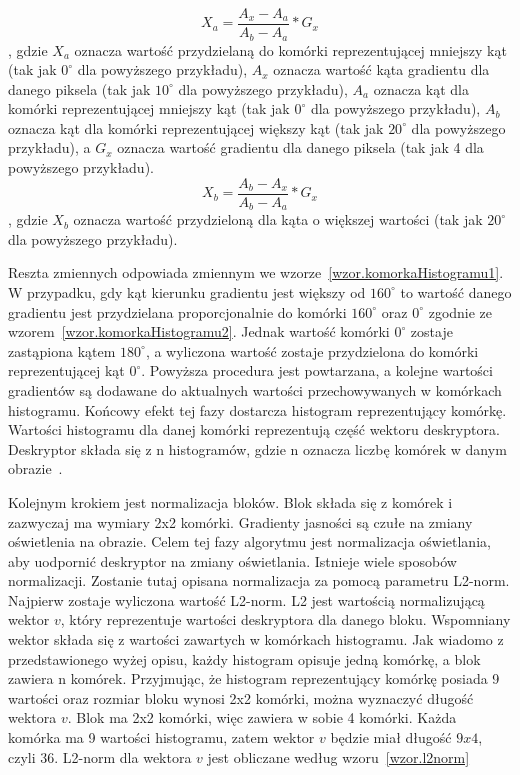 \documentclass[a4paper,twoside,12pt]{book}
\begin{document}
    \large
    \begin{equation}
        X_{a} = \frac{A_{x}-A_{a}}{A_{b}-A_{a}}*G_{x}
        \label{wzor.komorkaHistogramu1}
    \end{equation}
    \normalsize
    , gdzie $X_{a}$ oznacza wartość przydzielaną do komórki reprezentującej mniejszy kąt (tak jak $0^{\circ}$
    dla powyższego przykładu), $A_{x}$ oznacza wartość kąta gradientu dla danego piksela (tak jak $10^{\circ}$
    dla powyższego przykładu), $A_{a}$ oznacza kąt dla komórki reprezentującej mniejszy kąt (tak jak $0^{\circ}$
    dla powyższego przykładu), $A_{b}$ oznacza kąt dla komórki reprezentującej większy kąt (tak jak $20^{\circ}$
    dla powyższego przykładu), a $G_{x}$ oznacza wartość gradientu dla danego piksela (tak jak 4 dla powyższego
    przykładu).
    \large
    \begin{equation}
        X_{b} = \frac{A_{b}-A_{x}}{A_{b}-A_{a}}*G_{x}
        \label{wzor.komorkaHistogramu2}
    \end{equation}
    \normalsize
    , gdzie $X_{b}$ oznacza wartość przydzieloną dla kąta o większej wartości (tak jak $20^{\circ}$
    dla powyższego przykładu).

    Reszta zmiennych odpowiada zmiennym we wzorze~\ref{wzor.komorkaHistogramu1}.
    W przypadku, gdy kąt kierunku gradientu jest większy od $160^{\circ}$ to wartość danego gradientu jest
    przydzielana proporcjonalnie do komórki $160^{\circ}$ oraz $0^{\circ}$ zgodnie ze
    wzorem~\ref{wzor.komorkaHistogramu2}. Jednak wartość komórki $0^{\circ}$ zostaje zastąpiona kątem $180^{\circ}$,
    a wyliczona wartość zostaje przydzielona do komórki reprezentującej kąt $0^{\circ}$.
    Powyższa procedura jest powtarzana, a kolejne wartości gradientów są dodawane do aktualnych wartości przechowywanych
    w komórkach histogramu. Końcowy efekt tej fazy dostarcza histogram reprezentujący komórkę. Wartości histogramu
    dla danej komórki reprezentują część wektoru deskryptora. Deskryptor składa się z n histogramów, gdzie n oznacza
    liczbę komórek w danym obrazie~\cite{hogZabojady}.

    Kolejnym krokiem jest normalizacja bloków. Blok składa się z komórek i zazwyczaj ma wymiary 2x2 komórki.
    Gradienty jasności są czułe na zmiany oświetlenia na obrazie. Celem tej fazy algorytmu jest normalizacja oświetlania,
    aby uodpornić deskryptor na zmiany oświetlania.
    Istnieje wiele sposobów normalizacji. Zostanie tutaj opisana normalizacja za pomocą parametru L2-norm.
    Najpierw zostaje wyliczona wartość L2-norm. L2 jest wartością normalizującą wektor $v$, który reprezentuje wartości
    deskryptora dla danego bloku. Wspomniany wektor składa się z wartości zawartych w komórkach histogramu. Jak wiadomo z
    przedstawionego wyżej opisu, każdy histogram opisuje jedną komórkę, a blok zawiera n komórek.
    Przyjmując, że histogram reprezentujący komórkę posiada 9 wartości oraz rozmiar bloku
    wynosi 2x2 komórki, można wyznaczyć długość wektora $v$.
    Blok ma 2x2 komórki, więc zawiera w sobie 4 komórki. Każda komórka ma 9 wartości histogramu, zatem wektor $v$ będzie
    miał długość $9x4$, czyli 36.
    L2-norm dla wektora $v$ jest obliczane według wzoru~\ref{wzor.l2norm}
\end{document}
